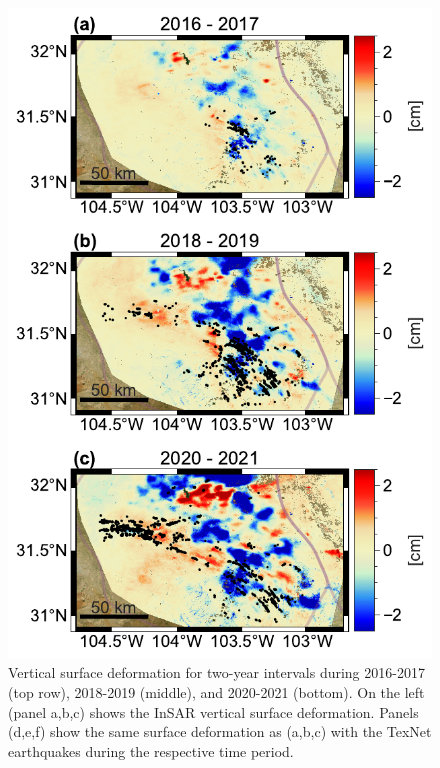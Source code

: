 \begin{figure}
	\centering
	\includegraphics[height=0.85\textheight]{figures/chapter5-lowess/figure-results-eqs.pdf}
	\caption[Earthquakes during two year intervals]{
		Vertical surface deformation for two-year intervals during 2016-2017 (top row), 2018-2019 (middle), and 2020-2021 (bottom). On the left (panel a,b,c) shows the InSAR vertical surface deformation.
		Panels (d,e,f) show the same surface deformation as (a,b,c) with the TexNet earthquakes during the respective time period.
	}
	\label{fig:ch5-discuss-eqs}
\end{figure}





